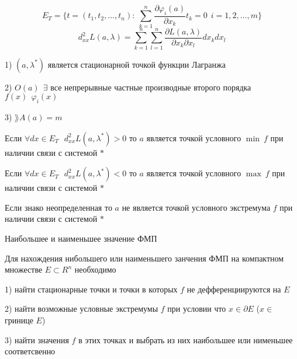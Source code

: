 \begin{define}
  $$
  E_T = \{t = (t_1, t_2, \ldots, t_n): ~ \sum_{k=1}^n
  \frac{\partial \varphi_i(a)}{\partial x_k} t_k = 0 ~~ i = 1,2,\ldots,m\}
  $$
  $$
  d_{xx}^2 L(a, \lambda) = \sum_{k=1}^n \sum_{l=1}^n
  \frac{\partial L(a, \lambda)}{\partial x_k \partial x_l} dx_k dx_l
  $$
\end{define}

\begin{block}
  1) $(a, \lambda^*)$ является стационарной точкой функции Лагранжа

  2) $O(a) ~~ \exists$ все непрерывные частные производные второго порядка
  $f(x) ~~ \varphi_i (x)$

  3) $\rang A(a) = m$

  Если $\forall dx \in E_T ~~~ d_{xx}^2 L(a, \lambda^*) > 0$ то $a$ является
  точкой условного $\min ~ f$ при наличии связи с системой $*$

  Если $\forall dx \in E_T ~~~ d_{xx}^2 L(a, \lambda^*) < 0$ то $a$ является
  точкой условного $\max ~ f$ при наличии связи с системой $*$

  Если знако неопределенная то $a$ не является точкой условного экстремума
  $f$ при наличии связи с системой $*$
\end{block}

\begin{title}[\Large]
  Наибольшее и наименьшее значение ФМП
\end{title}

\begin{block}
  Для нахождения нибольшего или наименьшего занчения ФМП на компактном
  множестве $E \subset R^n$ необходимо

  1) найти стационарные точки и точки в которых $f$ не дефференциируются на $E$

  2) найти возможные условные экстремумы $f$ при условии что $x \in \partial E$
  ($x \in$ гринице $E$)

  3) найти значения $f$ в этих точках и выбрать из них наибольшее или нименьшее
  соответсвенно
\end{block}